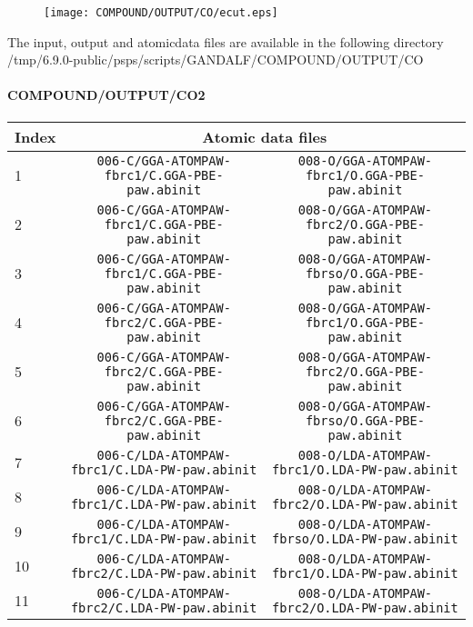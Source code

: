 \documentclass[onecolumn]{revtex4}
\begin{document}
\begin{figure}[h] 
\centering 
\texttt{[image: COMPOUND/OUTPUT/CO/ecut.eps]}
\end{figure}
\begin{htmlonly} 
The input, output and atomicdata files are available in the following directory 
  {/tmp/6.9.0-public/psps/scripts/GANDALF/COMPOUND/OUTPUT/CO} 
\end{htmlonly} 
\newpage
\paragraph*{\bf{COMPOUND/OUTPUT/CO2}}
\begin{center}
\begin{tabular}{lcc}
\hline
Index & \multicolumn{2}{c}{Atomic data files} \\
\hline
1 & \verb?006-C/GGA-ATOMPAW-fbrc1/C.GGA-PBE-paw.abinit? & \verb?008-O/GGA-ATOMPAW-fbrc1/O.GGA-PBE-paw.abinit? \\
2 & \verb?006-C/GGA-ATOMPAW-fbrc1/C.GGA-PBE-paw.abinit? & \verb?008-O/GGA-ATOMPAW-fbrc2/O.GGA-PBE-paw.abinit? \\
3 & \verb?006-C/GGA-ATOMPAW-fbrc1/C.GGA-PBE-paw.abinit? & \verb?008-O/GGA-ATOMPAW-fbrso/O.GGA-PBE-paw.abinit? \\
4 & \verb?006-C/GGA-ATOMPAW-fbrc2/C.GGA-PBE-paw.abinit? & \verb?008-O/GGA-ATOMPAW-fbrc1/O.GGA-PBE-paw.abinit? \\
5 & \verb?006-C/GGA-ATOMPAW-fbrc2/C.GGA-PBE-paw.abinit? & \verb?008-O/GGA-ATOMPAW-fbrc2/O.GGA-PBE-paw.abinit? \\
6 & \verb?006-C/GGA-ATOMPAW-fbrc2/C.GGA-PBE-paw.abinit? & \verb?008-O/GGA-ATOMPAW-fbrso/O.GGA-PBE-paw.abinit? \\
7 & \verb?006-C/LDA-ATOMPAW-fbrc1/C.LDA-PW-paw.abinit? & \verb?008-O/LDA-ATOMPAW-fbrc1/O.LDA-PW-paw.abinit? \\
8 & \verb?006-C/LDA-ATOMPAW-fbrc1/C.LDA-PW-paw.abinit? & \verb?008-O/LDA-ATOMPAW-fbrc2/O.LDA-PW-paw.abinit? \\
9 & \verb?006-C/LDA-ATOMPAW-fbrc1/C.LDA-PW-paw.abinit? & \verb?008-O/LDA-ATOMPAW-fbrso/O.LDA-PW-paw.abinit? \\
10 & \verb?006-C/LDA-ATOMPAW-fbrc2/C.LDA-PW-paw.abinit? & \verb?008-O/LDA-ATOMPAW-fbrc1/O.LDA-PW-paw.abinit? \\
11 & \verb?006-C/LDA-ATOMPAW-fbrc2/C.LDA-PW-paw.abinit? & \verb?008-O/LDA-ATOMPAW-fbrc2/O.LDA-PW-paw.abinit? \\

\end{tabular}
\end{center}
\end{document}
